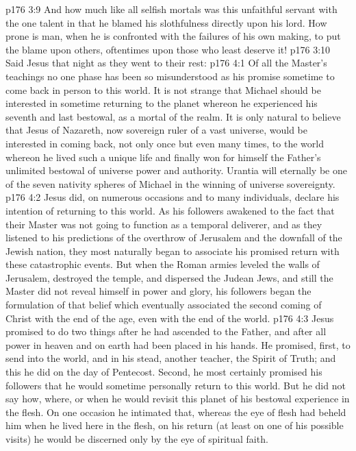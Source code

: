 \vs p176 3:9 And how much like all selfish mortals was this unfaithful servant with the one talent in that he blamed his slothfulness directly upon his lord. How prone is man, when he is confronted with the failures of his own making, to put the blame upon others, oftentimes upon those who least deserve it!
\vs p176 3:10 Said Jesus that night as they went to their rest: 
\vs p176 4:1 Of all the Master’s teachings no one phase has been so misunderstood as his promise sometime to come back in person to this world. It is not strange that Michael should be interested in sometime returning to the planet whereon he experienced his seventh and last bestowal, as a mortal of the realm. It is only natural to believe that Jesus of Nazareth, now sovereign ruler of a vast universe, would be interested in coming back, not only once but even many times, to the world whereon he lived such a unique life and finally won for himself the Father’s unlimited bestowal of universe power and authority. Urantia will eternally be one of the seven nativity spheres of Michael in the winning of universe sovereignty.
\vs p176 4:2 Jesus did, on numerous occasions and to many individuals, declare his intention of returning to this world. As his followers awakened to the fact that their Master was not going to function as a temporal deliverer, and as they listened to his predictions of the overthrow of Jerusalem and the downfall of the Jewish nation, they most naturally began to associate his promised return with these catastrophic events. But when the Roman armies leveled the walls of Jerusalem, destroyed the temple, and dispersed the Judean Jews, and still the Master did not reveal himself in power and glory, his followers began the formulation of that belief which eventually associated the second coming of Christ with the end of the age, even with the end of the world.
\vs p176 4:3 Jesus promised to do two things after he had ascended to the Father, and after all power in heaven and on earth had been placed in his hands. He promised, first, to send into the world, and in his stead, another teacher, the Spirit of Truth; and this he did on the day of Pentecost. Second, he most certainly promised his followers that he would sometime personally return to this world. But he did not say how, where, or when he would revisit this planet of his bestowal experience in the flesh. On one occasion he intimated that, whereas the eye of flesh had beheld him when he lived here in the flesh, on his return (at least on one of his possible visits) he would be discerned only by the eye of spiritual faith.
